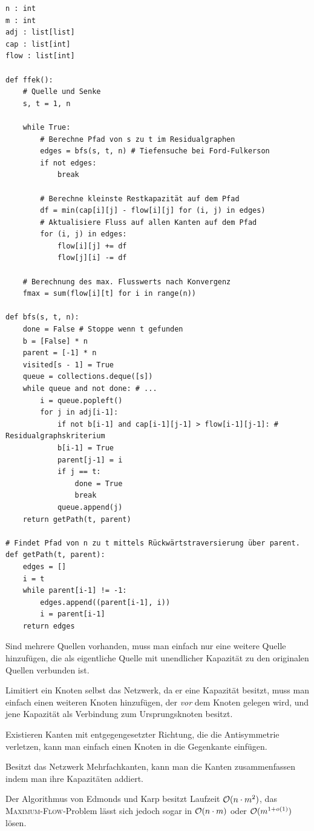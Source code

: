 \begin{lstlisting}
n : int
m : int
adj : list[list]
cap : list[int]
flow : list[int]

def ffek():
    # Quelle und Senke
    s, t = 1, n

    while True:
        # Berechne Pfad von s zu t im Residualgraphen
        edges = bfs(s, t, n) # Tiefensuche bei Ford-Fulkerson
        if not edges:
            break

        # Berechne kleinste Restkapazität auf dem Pfad
        df = min(cap[i][j] - flow[i][j] for (i, j) in edges)
        # Aktualisiere Fluss auf allen Kanten auf dem Pfad
        for (i, j) in edges:
            flow[i][j] += df
            flow[j][i] -= df

    # Berechnung des max. Flusswerts nach Konvergenz
    fmax = sum(flow[i][t] for i in range(n))

def bfs(s, t, n):
    done = False # Stoppe wenn t gefunden
    b = [False] * n
    parent = [-1] * n
    visited[s - 1] = True
    queue = collections.deque([s])
    while queue and not done: # ...
        i = queue.popleft()
        for j in adj[i-1]:
            if not b[i-1] and cap[i-1][j-1] > flow[i-1][j-1]: # Residualgraphskriterium
            b[i-1] = True
            parent[j-1] = i
            if j == t:
                done = True
                break
            queue.append(j)
    return getPath(t, parent)

# Findet Pfad von n zu t mittels Rückwärtstraversierung über parent.
def getPath(t, parent):
    edges = []
    i = t
    while parent[i-1] != -1:
        edges.append((parent[i-1], i))
        i = parent[i-1]
    return edges
\end{lstlisting}
Sind mehrere Quellen vorhanden, muss man einfach nur eine weitere Quelle hinzufügen, die als eigentliche Quelle mit unendlicher Kapazität zu den originalen Quellen verbunden ist.

Limitiert ein Knoten selbst das Netzwerk, da er eine Kapazität besitzt, muss man einfach einen weiteren Knoten hinzufügen, der \emph{vor} dem Knoten gelegen wird, und jene Kapazität als Verbindung zum Ursprungsknoten besitzt.

Existieren Kanten mit entgegengesetzter Richtung, die die Antisymmetrie verletzen, kann man einfach einen Knoten in die Gegenkante einfügen.

Besitzt das Netzwerk Mehrfachkanten, kann man die Kanten zusammenfassen indem man ihre Kapazitäten addiert.

Der Algorithmus von Edmonds und Karp besitzt Laufzeit \(\mathcal O(n \cdot m^2)\), das \textsc{Maximum-Flow}-Problem lässt sich jedoch sogar in \(\mathcal O(n \cdot m)\) oder \(\mathcal O(m^{1+o(1)})\) lösen.

